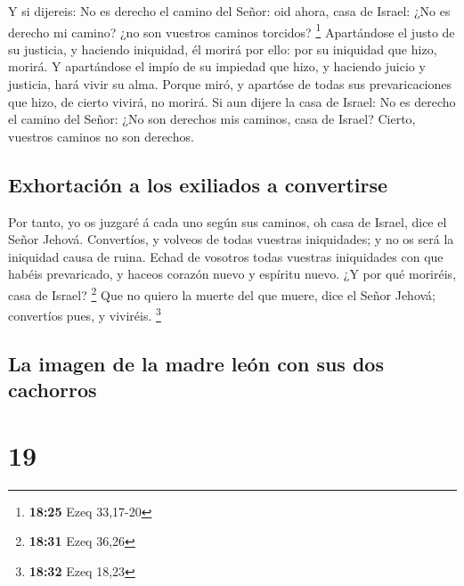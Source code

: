  Y si dijereis: No es derecho el camino del Señor: oid
ahora, casa de Israel: ¿No es derecho mi camino? ¿no son vuestros
caminos torcidos? \footnote{\textbf{18:25} Ezeq 33,17-20}
 Apartándose el justo de su justicia, y haciendo
iniquidad, él morirá por ello: por su iniquidad que hizo, morirá.
 Y apartándose el impío de su impiedad que hizo, y
haciendo juicio y justicia, hará vivir su alma.  Porque
miró, y apartóse de todas sus prevaricaciones que hizo, de cierto
vivirá, no morirá.  Si aun dijere la casa de Israel: No
es derecho el camino del Señor: ¿No son derechos mis caminos, casa de
Israel? Cierto, vuestros caminos no son derechos.

\hypertarget{exhortaciuxf3n-a-los-exiliados-a-convertirse}{%
\subsection{Exhortación a los exiliados a
convertirse}\label{exhortaciuxf3n-a-los-exiliados-a-convertirse}}

 Por tanto, yo os juzgaré á cada uno según sus caminos,
oh casa de Israel, dice el Señor Jehová. Convertíos, y volveos de todas
vuestras iniquidades; y no os será la iniquidad causa de ruina.
 Echad de vosotros todas vuestras iniquidades con que
habéis prevaricado, y haceos corazón nuevo y espíritu nuevo. ¿Y por qué
moriréis, casa de Israel? \footnote{\textbf{18:31} Ezeq 36,26}
 Que no quiero la muerte del que muere, dice el Señor
Jehová; convertíos pues, y viviréis. \footnote{\textbf{18:32} Ezeq 18,23}

\hypertarget{la-imagen-de-la-madre-leuxf3n-con-sus-dos-cachorros}{%
\subsection{La imagen de la madre león con sus dos
cachorros}\label{la-imagen-de-la-madre-leuxf3n-con-sus-dos-cachorros}}

\hypertarget{section-18}{%
\section{19}\label{section-18}}


